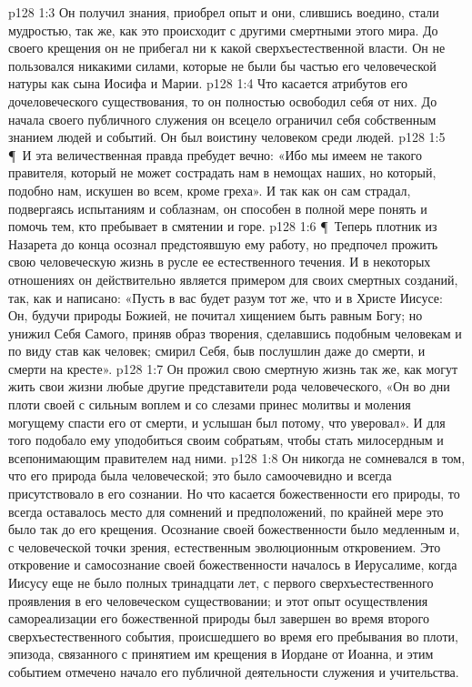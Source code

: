 \vs p128 1:3 Он получил знания, приобрел опыт и они, слившись воедино, стали мудростью, так же, как это происходит с другими смертными этого мира. До своего крещения он не прибегал ни к какой сверхъестественной власти. Он не пользовался никакими силами, которые не были бы частью его человеческой натуры как сына Иосифа и Марии.
\vs p128 1:4 Что касается атрибутов его дочеловеческого существования, то он полностью освободил себя от них. До начала своего публичного служения он всецело ограничил себя собственным знанием людей и событий. Он был воистину человеком среди людей.
\vs p128 1:5 \P\ И эта величественная правда пребудет вечно: «Ибо мы имеем не такого правителя, который не может сострадать нам в немощах наших, но который, подобно нам, искушен во всем, кроме греха». И так как он сам страдал, подвергаясь испытаниям и соблазнам, он способен в полной мере понять и помочь тем, кто пребывает в смятении и горе.
\vs p128 1:6 \P\ Теперь плотник из Назарета до конца осознал предстоявшую ему работу, но предпочел прожить свою человеческую жизнь в русле ее естественного течения. И в некоторых отношениях он действительно является примером для своих смертных созданий, так, как и написано: «Пусть в вас будет разум тот же, что и в Христе Иисусе: Он, будучи природы Божией, не почитал хищением быть равным Богу; но унижил Себя Самого, приняв образ творения, сделавшись подобным человекам и по виду став как человек; смирил Себя, быв послушлин даже до смерти, и смерти на кресте».
\vs p128 1:7 Он прожил свою смертную жизнь так же, как могут жить свои жизни любые другие представители рода человеческого, «Он во дни плоти своей с сильным воплем и со слезами принес молитвы и моления могущему спасти его от смерти, и услышан был потому, что уверовал». И для того подобало ему  уподобиться своим собратьям, чтобы стать милосердным и всепонимающим правителем над ними.
\vs p128 1:8 Он никогда не сомневался в том, что его природа была человеческой; это было самоочевидно и всегда присутствовало в его сознании. Но что касается божественности его природы, то всегда оставалось место для сомнений и предположений, по крайней мере это было так до его крещения. Осознание своей божественности было медленным и, с человеческой точки зрения, естественным эволюционным откровением. Это откровение и самосознание своей божественности началось в Иерусалиме, когда Иисусу еще не было полных тринадцати лет, с первого сверхъестественного проявления в его человеческом существовании; и этот опыт осуществления самореализации его божественной природы был завершен во время второго сверхъестественного события, происшедшего во время его пребывания во плоти, эпизода, связанного с принятием им крещения в Иордане от Иоанна, и этим событием отмечено начало его публичной деятельности служения и учительства.
